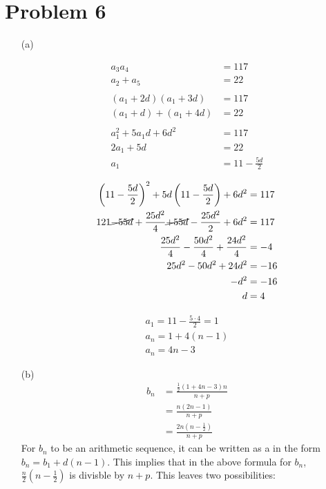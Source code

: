 \documentclass{article}
\begin{document}
\section*{Problem 6}
\begin{itemize}
\item[(a)]
\begin{minipage}[t]{0.4\linewidth}
\begin{align*}
	a_3a_4&=117 \\
	a_2+a_5&=22 \\
	\\
	(a_1+2d)(a_1+3d)&=117 \\
	(a_1+d)+(a_1+4d)&=22 \\
	\\
	a_1^2+5a_1d+6d^2&=117 \\
	2a_1+5d&=22 \\
	a_1&=11-\frac{5d}{2}
\end{align*}
\end{minipage}
\begin{minipage}[t]{0.4\linewidth}
\begin{align*}
	\left(11-\frac{5d}{2}\right)^2+5d\left(11-\frac{5d}{2}\right)+
		6d^2&=117 \\
	121\cancel{-55d}+\frac{25d^2}{4}\cancel{+55d}-\frac{25d^2}{2}+
		6d^2&=117 \\
	\frac{25d^2}{4}-\frac{50d^2}{4}+\frac{24d^2}{4}&=-4 \\
	25d^2-50d^2+24d^2&=-16 \\
	-d^2&=-16 \\
	d&=4
\end{align*}
\end{minipage}
\begin{gather*}
	a_1=11-\frac{5\cdot4}{2}=1 \\
	a_n=1+4(n-1) \\
	\boxed{a_n=4n-3}
\end{gather*}

\item[(b)]
\begin{align}
	b_n&=\frac{\frac{1}{2}(1+4n-3)n}{n+p} \nonumber\\
	&=\frac{n(2n-1)}{n+p} \\
	&=\frac{2n(n-\frac{1}{2})}{n+p}
\end{align}
For $b_n$ to be an arithmetic sequence, it can be written as a
in the form $b_n=b_1+d(n-1)$. This implies that in the above formula
for $b_n$, $\frac{n}{2}\left(n-\frac{1}{2}\right)$ is divisble
by $n+p$. This leaves two possibilities:


\end{itemize}
\end{document}
